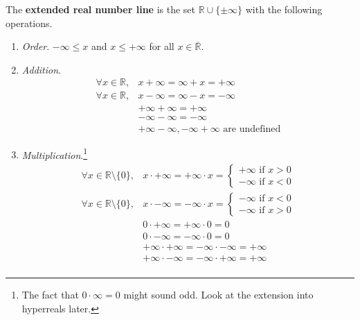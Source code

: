   \begin{definition}
    The \textbf{extended real number line} is the set $\mathbb{R} \cup \{\pm \infty\}$ with the following operations. 
    \begin{enumerate}
      \item \textit{Order}. $-\infty \leq x$ and $x \leq +\infty$ for all $x \in \overline{\mathbb{R}}$. 
      \item \textit{Addition}. 
        \begin{align}
          \forall x \in \mathbb{R}, & x + \infty = \infty + x = +\infty \\
          \forall x \in \mathbb{R}, & x - \infty = \infty - x = -\infty \\ 
          & + \infty + \infty = +\infty \\
          & - \infty - \infty = -\infty \\ 
          & +\infty - \infty, -\infty + \infty \text{ are undefined}
        \end{align}
      \item \textit{Multiplication}.\footnote{The fact that $0 \cdot \infty = 0$ might sound odd. Look at the extension into hyperreals later.} 
      \begin{align} 
        \forall x \in \mathbb{R} \setminus \{0\}, & x \cdot +\infty = +\infty \cdot x = \begin{cases} +\infty \text{ if } x > 0 \\ -\infty \text{ if } x < 0 \end{cases} \\
        \forall x \in \mathbb{R} \setminus \{0\}, & x \cdot -\infty = -\infty \cdot x = \begin{cases} -\infty \text{ if } x < 0 \\ -\infty \text{ if } x > 0 \end{cases} \\
        & 0 \cdot +\infty = +\infty \cdot 0 = 0 \\
        & 0 \cdot -\infty = -\infty \cdot 0 = 0 \\
        & +\infty \cdot +\infty = -\infty \cdot -\infty = +\infty \\ 
        & +\infty \cdot -\infty = -\infty \cdot +\infty = +\infty \\ 
      \end{align}
    \end{enumerate}
  \end{definition} 

